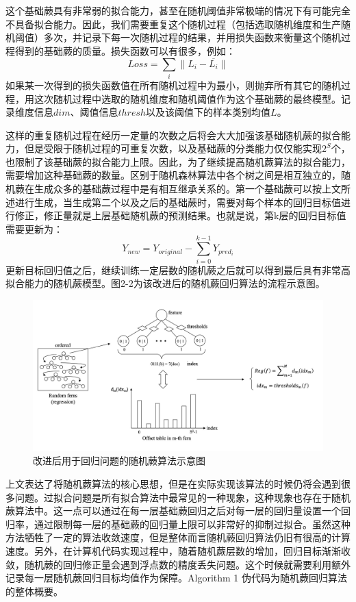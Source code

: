 这个基础蕨具有非常弱的拟合能力，甚至在随机阈值非常极端的情况下有可能完全不具备拟合能力。因此，我们需要重复这个随机过程（包括选取随机维度和生产随机阈值）多次，并记录下每一次随机过程的结果，并用损失函数来衡量这个随机过程得到的基础蕨的质量。损失函数可以有很多，例如：
\begin{equation}
	Loss=\sum_i{\|L_i-\overline{L_i}\|}
\end{equation}
如果某一次得到的损失函数值在所有随机过程中为最小，则抛弃所有其它的随机过程，用这次随机过程中选取的随机维度和随机阈值作为这个基础蕨的最终模型。记录维度信息$dim$、阈值信息$thresh$以及该阈值下的样本类别均值$L$。

这样的重复随机过程在经历一定量的次数之后将会大大加强该基础随机蕨的拟合能力，但是受限于随机过程的可重复次数，以及基础蕨的分类能力仅仅能实现$2^S$个，也限制了该基础蕨的拟合能力上限。因此，为了继续提高随机蕨算法的拟合能力，需要增加这种基础蕨的数量。区别于随机森林算法中各个树之间是相互独立的，随机蕨在生成众多的基础蕨过程中是有相互继承关系的。第一个基础蕨可以按上文所述进行生成，当生成第二个以及之后的基础蕨时，需要对每个样本的回归目标值进行修正，修正量就是上层基础随机蕨的预测结果。也就是说，第k层的回归目标值需要更新为：
\begin{equation}
	Y_{new}=Y_{original}-\sum_{i=0}^{k-1} Y_{pred_i}
\end{equation}
更新目标回归值之后，继续训练一定层数的随机蕨之后就可以得到最后具有非常高拟合能力的随机蕨模型。图2-2为该改进后的随机蕨回归算法的流程示意图。
\begin{figure}[htb]
	\centering 
	\includegraphics[width=\textwidth]{./mypic/改进后的随机蕨算法示意图.jpg} 
	\caption{改进后用于回归问题的随机蕨算法示意图} 
\end{figure}

上文表达了将随机蕨算法的核心思想，但是在实际实现该算法的时候仍将会遇到很多问题。过拟合问题是所有拟合算法中最常见的一种现象，这种现象也存在于随机蕨算法中。这一点可以通过在每一层基础蕨回归之后对每一层的回归量设置一个回归率，通过限制每一层的基础蕨的回归量上限可以非常好的抑制过拟合。虽然这种方法牺牲了一定的算法收敛速度，但是整体而言随机蕨回归算法仍旧有很高的计算速度。另外，在计算机代码实现过程中，随着随机蕨层数的增加，回归目标渐渐收敛，随机蕨的回归修正量会遇到浮点数的精度丢失问题。这个时候就需要利用额外记录每一层随机蕨回归目标均值作为保障。Algorithm 1 伪代码为随机蕨回归算法的整体概要。
\newpage

